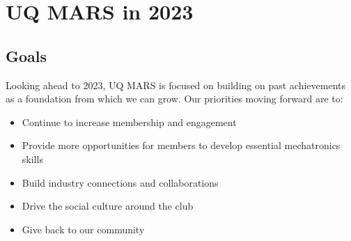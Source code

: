\documentclass[a4paper,12pt]{report}
\begin{document}
\newpage

\section*{UQ MARS in 2023}
\subsection*{Goals}
Looking ahead to 2023, UQ MARS is focused on building on past achievements as a foundation from which we can grow. Our priorities moving forward are to:
\begin{itemize}
    \item Continue to increase membership and engagement
    \item Provide more opportunities for members to develop essential mechatronics skills
    \item Build industry connections and collaborations
    \item Drive the social culture around the club
    \item Give back to our community
\end{itemize}
\end{document}
